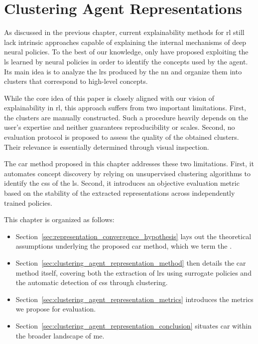 \chapter{Clustering Agent Representations}
\label{chap:clustering_agent_representation}

\glsresetall

As discussed in the previous chapter, current explainability methods for \gls{rl} still lack intrinsic approaches capable of explaining the internal mechanisms of deep neural policies.
To the best of our knowledge, only \parencite{zahavy2017graying} have proposed exploiting the \gls{ls} learned by neural policies in order to identify the concepts used by the agent.
Its main idea is to analyze the \glspl{lr} produced by the \gls{nn} and organize them into clusters that correspond to high-level concepts.

While the core idea of this paper is closely aligned with our vision of explainability in \gls{rl}, this approach suffers from two important limitations.
First, the clusters are manually constructed.
Such a procedure heavily depends on the user's expertise and neither guarantees reproducibility or scales.
Second, no evaluation protocol is proposed to assess the quality of the obtained clusters.
Their relevance is essentially determined through visual inspection.

The \gls{car} method proposed in this chapter addresses these two limitations.
First, it automates concept discovery by relying on unsupervised clustering algorithms to identify the \glspl{cs} of the \gls{ls}.
Second, it introduces an objective evaluation metric based on the stability of the extracted representations across independently trained policies.

This chapter is organized as follows:
\begin{itemize}
    \item Section~\ref{sec:representation_convergence_hypothesis} lays out the theoretical assumptions underlying the proposed \gls{car} method, which we term the \RepresentationConvergenceHypothesisName.
    \item Section~\ref{sec:clustering_agent_representation_method} then details the \gls{car} method itself, covering both the extraction of \glspl{lr} using surrogate policies and the automatic detection of \glspl{cs} through clustering.
    \item Section~\ref{sec:clustering_agent_representation_metrics} introduces the metrics we propose for evaluation.
    \item Section~\ref{sec:clustering_agent_representation_conclusion} situates \gls{car} within the broader landscape of \gls{me}.
\end{itemize}





